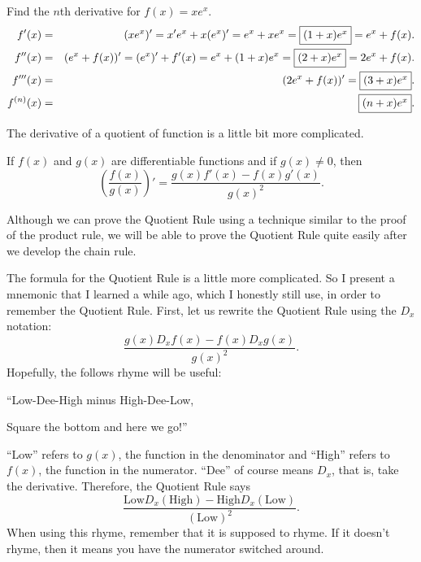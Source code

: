 \documentclass{book}
\begin{document}
\begin{Exam} Find the $n$th derivative for $f(x) = xe^x$. 
\begin{eqnarray*}
f'(x) &=& (xe^x)' = x'e^x + x(e^x)' = e^x+xe^x = \fbox{$(1+x)e^x$} = e^x+f(x).\\
f''(x)  &=& (e^x+f(x))' = (e^x)' + f'(x) = e^x + (1+x)e^x = \fbox{$(2+x)e^x$} = 2e^x + f(x).\\
f'''(x) &=&(2e^x+f(x))' = \fbox{$(3+x)e^x$}.\\
f^{(n)}(x) &=& \fbox{$(n+x)e^x$}.
\end{eqnarray*}
\end{Exam}\vs

The derivative of a quotient of function is a little bit more complicated.

\begin{Thm} If $f(x)$ and $g(x)$ are differentiable functions and if $g(x) \neq 0$, then 
\[ \left(\dfrac{f(x)}{g(x)}\right)' = \dfrac{g(x)f'(x) - f(x)g'(x)}{g(x)^2}.\]\end{Thm}
\begin{pf} Although we can prove the Quotient Rule using a technique similar to the proof of the product rule, we will be able to prove the Quotient Rule quite easily after we develop the chain rule.\end{pf}\vs

The formula for the Quotient Rule is a little more complicated. So I present a mnemonic that I learned a while ago, which I honestly still use, in order to remember the Quotient Rule. First, let us rewrite the Quotient Rule using the $D_x$ notation:
\[\dfrac{g(x)D_xf(x) - f(x)D_xg(x)}{g(x)^2}.\] Hopefully, the follows rhyme will be useful: \\

\centerline{``Low-Dee-High minus High-Dee-Low,}
\centerline{ Square the bottom and here we go!''}\vspace{0.1 in}

``Low'' refers to $g(x)$, the function in the denominator and ``High'' refers to $f(x)$, the function in the numerator. ``Dee'' of course means $D_x$, that is, take the derivative. Therefore, the Quotient Rule says \[\dfrac{\mbox{Low}D_x(\mbox{High}) -  \mbox{High}D_x(\mbox{Low})}{(\mbox{Low})^2}.\] When using this rhyme, remember that it is supposed to rhyme. If it doesn't rhyme, then it means you have the numerator switched around. 
\end{document}
